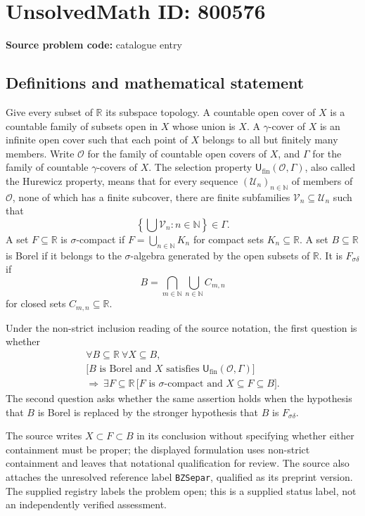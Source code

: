 \documentclass[11pt]{article}
\newcommand{\N}{\mathbb{N}}
\newcommand{\R}{\mathbb{R}}
\begin{document}
\section*{UnsolvedMath ID: 800576}
\textbf{Source problem code:} catalogue entry
\subsection{Definitions and mathematical statement}
Give every subset of \(\R\) its subspace topology. A countable open cover of \(X\) is a countable family of subsets open in \(X\) whose union is \(X\). A \(\gamma\)-cover of \(X\) is an infinite open cover such that each point of \(X\) belongs to all but finitely many members. Write \(\mathcal O\) for the family of countable open covers of \(X\), and \(\Gamma\) for the family of countable \(\gamma\)-covers of \(X\). The selection property \(\mathsf U_{\mathrm{fin}}(\mathcal O,\Gamma)\), also called the Hurewicz property, means that for every sequence \((\mathcal U_n)_{n\in\N}\) of members of \(\mathcal O\), none of which has a finite subcover, there are finite subfamilies \(\mathcal V_n\subseteq\mathcal U_n\) such that
\[
\left\{\bigcup\mathcal V_n:n\in\N\right\}\in\Gamma.
\]
A set \(F\subseteq\R\) is \(\sigma\)-compact if \(F=\bigcup_{n\in\N}K_n\) for compact sets \(K_n\subseteq\R\). A set \(B\subseteq\R\) is Borel if it belongs to the \(\sigma\)-algebra generated by the open subsets of \(\R\). It is \(F_{\sigma\delta}\) if
\[
B=\bigcap_{m\in\N}\bigcup_{n\in\N}C_{m,n}
\]
for closed sets \(C_{m,n}\subseteq\R\).

Under the non-strict inclusion reading of the source notation, the first question is whether
\[
\begin{gathered}
\forall B\subseteq\R\ \forall X\subseteq B,\\
\bigl[B\text{ is Borel and }X\text{ satisfies }\mathsf U_{\mathrm{fin}}(\mathcal O,\Gamma)\bigr]\\
\Longrightarrow\ \exists F\subseteq\R\,
\bigl[F\text{ is }\sigma\text{-compact and }X\subseteq F\subseteq B\bigr].
\end{gathered}
\]
The second question asks whether the same assertion holds when the hypothesis that \(B\) is Borel is replaced by the stronger hypothesis that \(B\) is \(F_{\sigma\delta}\).

The source writes \(X\subset F\subset B\) in its conclusion without specifying whether either containment must be proper; the displayed formulation uses non-strict containment and leaves that notational qualification for review. The source also attaches the unresolved reference label \texttt{BZSepar}, qualified as its preprint version. The supplied registry labels the problem open; this is a supplied status label, not an independently verified assessment.
\end{document}
